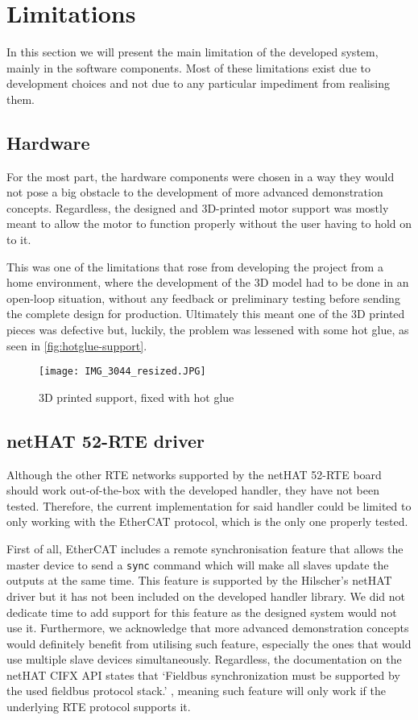 \section{Limitations} \label{sec:limitations}
In this section we will present the main limitation of the developed system, mainly in the software components.
Most of these limitations exist due to development choices and not due to any particular impediment from realising them.

\subsection{Hardware}
For the most part, the hardware components were chosen in a way they would not pose a big obstacle to the development of more advanced demonstration concepts.
Regardless, the designed and 3D-printed motor support was mostly meant to allow the motor to function properly without the user having to hold on to it.

This was one of the limitations that rose from developing the project from a home environment, where the development of the 3D model had to be done in an open-loop situation, without any feedback or preliminary testing before sending the complete design for production.
Ultimately this meant one of the 3D printed pieces was defective but, luckily, the problem was lessened with some hot glue, as seen in \autoref{fig:hotglue-support}.

\begin{figure}[htp]
	\centering
	\texttt{[image: IMG\_3044\_resized.JPG]}
	\caption{3D printed support, fixed with hot glue}
	\label{fig:hotglue-support}
\end{figure}

\subsection{netHAT 52-RTE driver}
Although the other RTE networks supported by the netHAT 52-RTE board should work out-of-the-box with the developed handler, they have not been tested.
Therefore, the current implementation for said handler could be limited to only working with the EtherCAT protocol, which is the only one properly tested.

First of all, EtherCAT includes a remote synchronisation feature that allows the master device to send a \verb|sync| command which will make all slaves update the outputs at the same time.
This feature is supported by the Hilscher's netHAT driver but it has not been included on the developed handler library.
We did not dedicate time to add support for this feature as the designed system would not use it.
Furthermore, we acknowledge that more advanced demonstration concepts would definitely benefit from utilising such feature, especially the ones that would use multiple slave devices simultaneously.
Regardless, the documentation on the netHAT CIFX API states that `Fieldbus synchronization must be supported by the used fieldbus protocol stack.' \cite{nethat:cifx_api_docs}, meaning such feature will only work if the underlying RTE protocol supports it.

